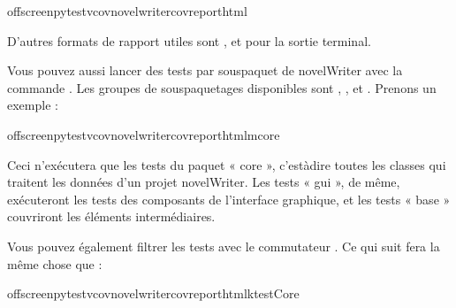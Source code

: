 \documentclass[a4paper,11pt,french]{sphinxmanual}
\begin{document}
\begin{sphinxVerbatim}[commandchars=\\\{\}]
offscreenpytest\PYGZhy{}v\PYGZhy{}\PYGZhy{}covnovelwriter\PYGZhy{}\PYGZhy{}cov\PYGZhy{}reporthtml
\end{sphinxVerbatim}

\sphinxAtStartPar
D’autres formats de rapport utiles sont , et  pour la sortie terminal.

\sphinxAtStartPar
Vous pouvez aussi lancer des tests par sous\sphinxhyphen{}paquet de novelWriter avec la commande . Les groupes de sous\sphinxhyphen{}paquetages disponibles sont , , et . Prenons un exemple :

\begin{sphinxVerbatim}[commandchars=\\\{\}]
offscreenpytest\PYGZhy{}v\PYGZhy{}\PYGZhy{}covnovelwriter\PYGZhy{}\PYGZhy{}cov\PYGZhy{}reporthtml\PYGZhy{}mcore
\end{sphinxVerbatim}

\sphinxAtStartPar
Ceci n’exécutera que les tests du paquet « core », c’est\sphinxhyphen{}à\sphinxhyphen{}dire toutes les classes qui traitent les données d’un projet novelWriter. Les tests « gui », de même, exécuteront les tests des composants de l’interface graphique, et les tests « base » couvriront les éléments intermédiaires.

\sphinxAtStartPar
Vous pouvez également filtrer les tests avec le commutateur . Ce qui suit fera la même chose que  :

\begin{sphinxVerbatim}[commandchars=\\\{\}]
offscreenpytest\PYGZhy{}v\PYGZhy{}\PYGZhy{}covnovelwriter\PYGZhy{}\PYGZhy{}cov\PYGZhy{}reporthtml\PYGZhy{}ktestCore
\end{sphinxVerbatim}
\end{document}
